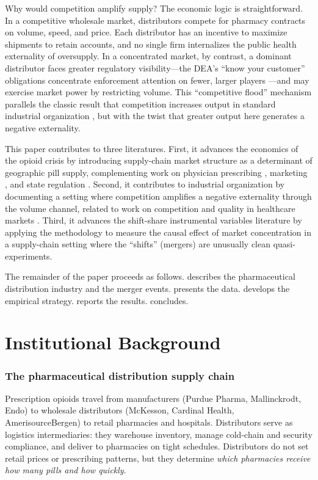 \documentclass[12pt]{article}
\begin{document}
Why would competition amplify supply? The economic logic is straightforward. In a competitive wholesale market, distributors compete for pharmacy contracts on volume, speed, and price. Each distributor has an incentive to maximize shipments to retain accounts, and no single firm internalizes the public health externality of oversupply. In a concentrated market, by contrast, a dominant distributor faces greater regulatory visibility---the DEA's ``know your customer'' obligations concentrate enforcement attention on fewer, larger players \citep{rannazzisi2014statement}---and may exercise market power by restricting volume. This ``competitive flood'' mechanism parallels the classic result that competition increases output in standard industrial organization \citep{tirole1988theory}, but with the twist that greater output here generates a negative externality.

This paper contributes to three literatures. First, it advances the economics of the opioid crisis by introducing supply-chain market structure as a determinant of geographic pill supply, complementing work on physician prescribing \citep{schnell2017physician}, marketing \citep{alpert2022origins}, and state regulation \citep{buchmueller2020effect}. Second, it contributes to industrial organization by documenting a setting where competition amplifies a negative externality through the volume channel, related to work on competition and quality in healthcare markets \citep{dranove2003more, gaynor2015free}. Third, it advances the shift-share instrumental variables literature \citep{borusyak2022quasi, goldsmith2020bartik, adao2019shift} by applying the methodology to measure the causal effect of market concentration in a supply-chain setting where the ``shifts'' (mergers) are unusually clean quasi-experiments.

The remainder of the paper proceeds as follows.  describes the pharmaceutical distribution industry and the merger events.  presents the data.  develops the empirical strategy.  reports the results.  concludes.

\section{Institutional Background}
\label{sec:background}

\subsubsection*{The pharmaceutical distribution supply chain} Prescription opioids travel from manufacturers (Purdue Pharma, Mallinckrodt, Endo) to wholesale distributors (McKesson, Cardinal Health, AmerisourceBergen) to retail pharmacies and hospitals. Distributors serve as logistics intermediaries: they warehouse inventory, manage cold-chain and security compliance, and deliver to pharmacies on tight schedules. Distributors do not set retail prices or prescribing patterns, but they determine \emph{which pharmacies receive how many pills and how quickly}.
\end{document}
